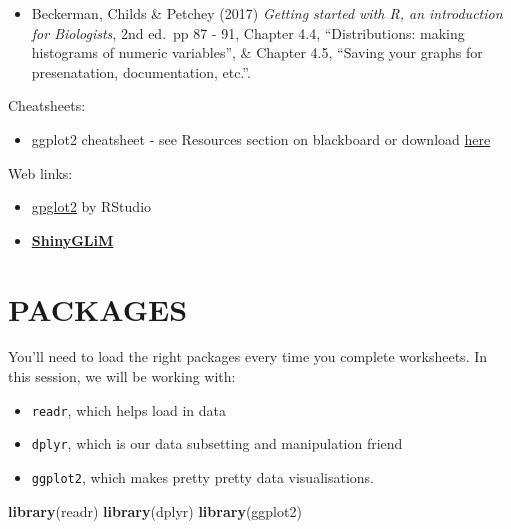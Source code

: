 \documentclass[
]{book}
\newenvironment{Shaded}{\begin{snugshade}}{\end{snugshade}}
\newcommand{\KeywordTok}[1]{\textcolor[rgb]{0.13,0.29,0.53}{\textbf{#1}}}
\newcommand{\NormalTok}[1]{#1}
\providecommand{\tightlist}{%
  \setlength{\itemsep}{0pt}\setlength{\parskip}{0pt}}
\begin{document}
\begin{itemize}
\tightlist
\item
  Beckerman, Childs \& Petchey (2017) \emph{Getting started with R, an
  introduction for Biologists}, 2nd ed.~pp 87 - 91, Chapter 4.4, ``Distributions:
  making histograms of numeric variables'', \& Chapter 4.5, ``Saving your graphs for
  presenatation, documentation, etc.''.
  ~
\end{itemize}

Cheatsheets:

\begin{itemize}
\tightlist
\item
  ggplot2 cheatsheet - see Resources section on blackboard or
  download \href{https://rstudio.com/wp-content/uploads/2015/03/ggplot2-cheatsheet.pdf}{here}
  ~
\end{itemize}

Web links:

\begin{itemize}
\item
  \href{https://ggplot2.tidyverse.org/}{gpglot2} by RStudio\\
  \hspace*{0.333em}
\item
  \href{https://iainmstott.shinyapps.io/ShinyGLiM}{\textbf{ShinyGLiM}}\\
\end{itemize}

\hypertarget{packages}{%
\section{PACKAGES}\label{packages}}

You'll need to load the right packages every time you complete worksheets. In
this session, we will be working with:

\begin{itemize}
\tightlist
\item
  \texttt{readr}, which helps load in data
\item
  \texttt{dplyr}, which is our data subsetting and manipulation friend
\item
  \texttt{ggplot2}, which makes pretty pretty data visualisations.
\end{itemize}

\begin{Shaded}
\begin{Highlighting}[]
\KeywordTok{library}\NormalTok{(readr)}
\KeywordTok{library}\NormalTok{(dplyr)}
\KeywordTok{library}\NormalTok{(ggplot2)}
\end{Highlighting}
\end{Shaded}
\end{document}
